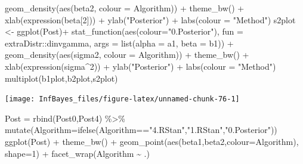 \documentclass[
]{book}
\newenvironment{Shaded}{\begin{snugshade}}{\end{snugshade}}
\newcommand{\AttributeTok}[1]{\textcolor[rgb]{0.77,0.63,0.00}{#1}}
\newcommand{\DecValTok}[1]{\textcolor[rgb]{0.00,0.00,0.81}{#1}}
\newcommand{\FunctionTok}[1]{\textcolor[rgb]{0.00,0.00,0.00}{#1}}
\newcommand{\NormalTok}[1]{#1}
\newcommand{\OtherTok}[1]{\textcolor[rgb]{0.56,0.35,0.01}{#1}}
\newcommand{\SpecialCharTok}[1]{\textcolor[rgb]{0.00,0.00,0.00}{#1}}
\newcommand{\StringTok}[1]{\textcolor[rgb]{0.31,0.60,0.02}{#1}}
\begin{document}
\begin{Shaded}
\begin{Highlighting}[]
  \FunctionTok{geom\_density}\NormalTok{(}\FunctionTok{aes}\NormalTok{(beta2, }\AttributeTok{colour =}\NormalTok{ Algorithm)) }\SpecialCharTok{+} \FunctionTok{theme\_bw}\NormalTok{() }\SpecialCharTok{+}
  \FunctionTok{xlab}\NormalTok{(}\FunctionTok{expression}\NormalTok{(beta[}\DecValTok{2}\NormalTok{])) }\SpecialCharTok{+} \FunctionTok{ylab}\NormalTok{(}\StringTok{"Posterior"}\NormalTok{) }\SpecialCharTok{+} \FunctionTok{labs}\NormalTok{(}\AttributeTok{colour =} \StringTok{"Method"}\NormalTok{)}
\NormalTok{s2plot }\OtherTok{\textless{}{-}} \FunctionTok{ggplot}\NormalTok{(Post)}\SpecialCharTok{+}
  \FunctionTok{stat\_function}\NormalTok{(}\FunctionTok{aes}\NormalTok{(}\AttributeTok{colour=}\StringTok{"0.Posterior"}\NormalTok{), }\AttributeTok{fun =}\NormalTok{ extraDistr}\SpecialCharTok{::}\NormalTok{dinvgamma, }\AttributeTok{args =} \FunctionTok{list}\NormalTok{(}\AttributeTok{alpha =}\NormalTok{ a1, }\AttributeTok{beta =}\NormalTok{ b1)) }\SpecialCharTok{+}
  \FunctionTok{geom\_density}\NormalTok{(}\FunctionTok{aes}\NormalTok{(sigma2, }\AttributeTok{colour =}\NormalTok{ Algorithm)) }\SpecialCharTok{+} \FunctionTok{theme\_bw}\NormalTok{() }\SpecialCharTok{+}
  \FunctionTok{xlab}\NormalTok{(}\FunctionTok{expression}\NormalTok{(sigma}\SpecialCharTok{\^{}}\DecValTok{2}\NormalTok{)) }\SpecialCharTok{+} \FunctionTok{ylab}\NormalTok{(}\StringTok{"Posterior"}\NormalTok{) }\SpecialCharTok{+} \FunctionTok{labs}\NormalTok{(}\AttributeTok{colour =} \StringTok{"Method"}\NormalTok{)}
\FunctionTok{multiplot}\NormalTok{(b1plot,b2plot,s2plot)}
\end{Highlighting}
\end{Shaded}

\begin{center}\texttt{[image: InfBayes\_files/figure-latex/unnamed-chunk-76-1]} \end{center}

\begin{Shaded}
\begin{Highlighting}[]
\NormalTok{Post }\OtherTok{=} \FunctionTok{rbind}\NormalTok{(Post0,Post4) }\SpecialCharTok{\%\textgreater{}\%}
  \FunctionTok{mutate}\NormalTok{(}\AttributeTok{Algorithm=}\FunctionTok{ifelse}\NormalTok{(Algorithm}\SpecialCharTok{==}\StringTok{"4.RStan"}\NormalTok{,}\StringTok{"1.RStan"}\NormalTok{,}\StringTok{"0.Posterior"}\NormalTok{))}
\FunctionTok{ggplot}\NormalTok{(Post) }\SpecialCharTok{+} \FunctionTok{theme\_bw}\NormalTok{() }\SpecialCharTok{+}
  \FunctionTok{geom\_point}\NormalTok{(}\FunctionTok{aes}\NormalTok{(beta1,beta2,}\AttributeTok{colour=}\NormalTok{Algorithm), }\AttributeTok{shape=}\DecValTok{1}\NormalTok{) }\SpecialCharTok{+}
  \FunctionTok{facet\_wrap}\NormalTok{(Algorithm }\SpecialCharTok{\textasciitilde{}}\NormalTok{ .)}
\end{Highlighting}
\end{Shaded}
\end{document}

